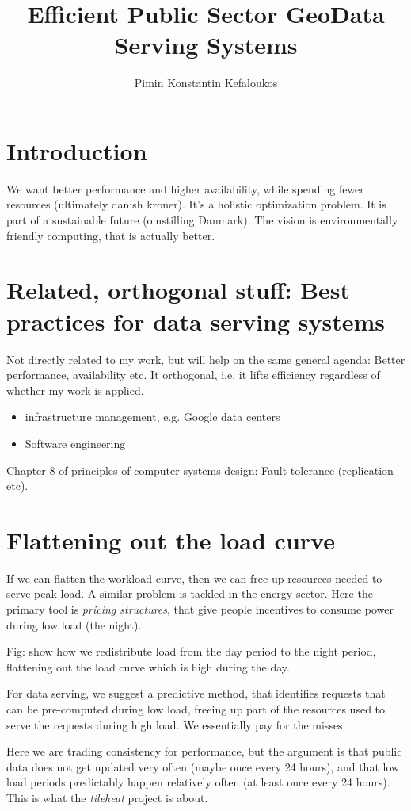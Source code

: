 \documentclass[11pt]{amsart}
\title{Efficient Public Sector GeoData Serving Systems}
\author{Pimin Konstantin Kefaloukos}
\begin{document}
\maketitle
\section{Introduction}
We want better performance and higher availability, while spending fewer resources (ultimately danish kroner). It's a holistic optimization problem. It is part of a sustainable future (omstilling Danmark). The vision is environmentally friendly computing, that is actually better.

\section{Related, orthogonal stuff: Best practices for data serving systems}

Not directly related to my work, but will help on the same general agenda: Better performance, availability etc. It orthogonal, i.e. it lifts efficiency regardless of whether my work is applied.

\begin{itemize}
\item infrastructure management, e.g. Google data centers
\item Software engineering
\end{itemize}

Chapter 8 of principles of computer systems design: Fault tolerance (replication etc).


\section{Flattening out the load curve}
If we can flatten the workload curve, then we can free up resources needed to serve peak load. A similar problem is tackled in the energy sector. Here the primary tool is \emph{pricing structures}, that give people incentives to consume power during low load (the night).

Fig: show how we redistribute load from the day period to the night period, flattening out the load curve which is high during the day.

For data serving, we suggest a predictive method, that identifies requests that can be pre-computed during low load, freeing up part of the resources used to serve the requests during high load. We essentially pay for the misses.

Here we are trading consistency for performance, but the argument is that public data does not get updated very often (maybe once every 24 hours), and that low load periods predictably happen relatively often (at least once every 24 hours). This is what the \emph{tileheat} project is about.
\end{document}
